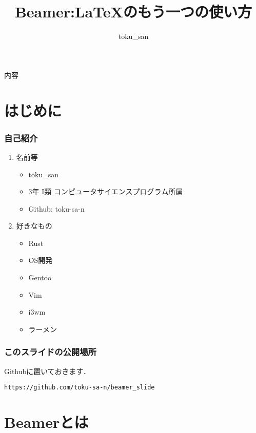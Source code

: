 \documentclass[dvipdfmx,uplatex,a4j,12pt]{beamer}
\begin{document}
\title{Beamer:\LaTeX のもう一つの使い方}
\author{toku\_san}

\begin{frame}
    \titlepage
\end{frame}

\begin{frame}{内容}
    \tableofcontents
\end{frame}

\section{はじめに}

\begin{frame}
    \frametitle{自己紹介}

    \begin{enumerate}
        \item 名前等
            \begin{itemize}
                \item toku\_san
                \item 3年 I類 コンピュータサイエンスプログラム所属
                \item Github: toku-sa-n
            \end{itemize}
        \item 好きなもの
            \begin{itemize}
                \item Rust
                \item OS開発
                \item Gentoo
                \item Vim
                \item i3wm
                \item ラーメン
            \end{itemize}
    \end{enumerate}
\end{frame}

\begin{frame}[fragile]
    \frametitle{このスライドの公開場所}

    Githubに置いておきます．

    \begin{verbatim}
https://github.com/toku-sa-n/beamer_slide
    \end{verbatim}
\end{frame}

\section{Beamerとは}
\end{document}
